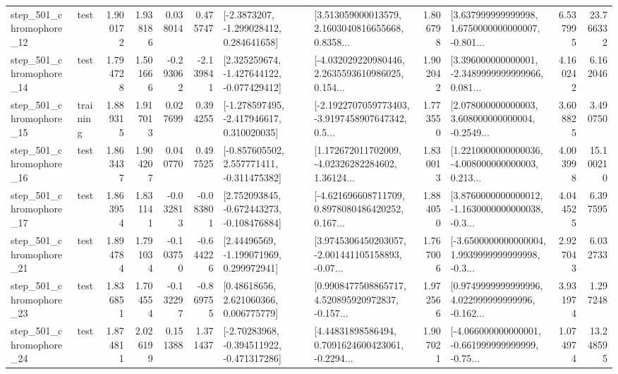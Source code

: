 \begin{tabular}{llrrrrllrlrr}
  step\_501\_chromophore\_12 &      test &      1.900172 &    1.938186 &      0.038014 &  0.475747 &     [-2.3873207, -1.299028412, 0.284641658] &  [3.513059000013579, 2.1603040816655668, 0.8358... &       1.806798 &  [3.637999999999998, 1.6750000000000007, -0.801... &            6.537995 &         23.766332 \\
  step\_501\_chromophore\_14 &      test &      1.794728 &    1.501666 &     -0.293062 & -2.139841 &   [2.325259674, -1.427644122, -0.077429412] &  [-4.032029220980446, 2.2635593610986025, 0.154... &       1.902042 &  [3.396000000000001, -2.3489999999999966, 0.081... &            4.160242 &          6.162046 \\
  step\_501\_chromophore\_15 &  training &      1.889315 &    1.917013 &      0.027699 &  0.394255 &   [-1.278597495, -2.417946617, 0.310020035] &  [-2.1922707059773403, -3.9197458907647342, 0.5... &       1.773550 &  [2.078000000000003, 3.608000000000004, -0.2549... &            3.608825 &          3.490750 \\
  step\_501\_chromophore\_16 &      test &      1.863437 &    1.904207 &      0.040770 &  0.497525 &   [-0.857605502, 2.557771411, -0.311475382] &  [1.172672011702009, -4.02326282284602, 1.36124... &       1.830013 &  [1.2210000000000036, -4.008000000000003, 0.213... &            4.003998 &         15.100210 \\
  step\_501\_chromophore\_17 &      test &      1.863954 &    1.831141 &     -0.032813 & -0.083801 &   [2.752093845, -0.672443273, -0.108476884] &  [-4.621696608711709, 0.8978080486420252, 0.167... &       1.884050 &  [3.8760000000000012, -1.1630000000000038, -0.3... &            4.044525 &          6.397595 \\
  step\_501\_chromophore\_21 &      test &      1.894784 &    1.791034 &     -0.103750 & -0.644226 &     [2.44496569, -1.199071969, 0.299972941] &  [3.9745306450203057, -2.001441105158893, -0.07... &       1.767006 &  [-3.6500000000000004, 1.9939999999999998, -0.3... &            2.927043 &          6.032733 \\
  step\_501\_chromophore\_23 &      test &      1.836851 &    1.704554 &     -0.132297 & -0.869755 &      [0.48618656, 2.621060366, 0.006775779] &  [0.9908477508865717, 4.520895920972837, -0.157... &       1.972566 &  [0.9749999999999996, 4.022999999999996, -0.162... &            3.931974 &          1.297248 \\
  step\_501\_chromophore\_24 &      test &      1.874811 &    2.026199 &      0.151388 &  1.371437 &   [-2.70283968, -0.394511922, -0.471317286] &  [4.44831898586494, 0.7091624600423061, -0.2294... &       1.907021 &  [-4.066000000000001, -0.661999999999999, -0.75... &            1.074974 &         13.248595 \\

\end{tabular}
